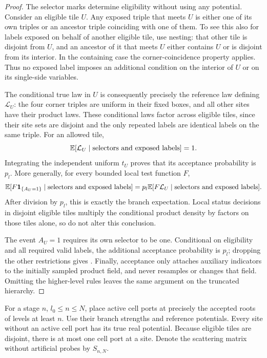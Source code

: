 \begin{proof}
The selector marks determine eligibility without using any potential.
Consider an eligible tile $U$.  Any exposed triple that meets $U$ is
either one of its own triples or an ancestor triple coinciding with one
of them.  To see this also for labels exposed on behalf of another
eligible tile, use nesting: that other tile is disjoint from $U$, and an
ancestor of it that meets $U$ either contains $U$ or is disjoint from its
interior.  In the containing case the corner-coincidence property applies.
Thus no exposed label imposes an additional condition on the interior of
$U$ or on its single-side variables.

The conditional true law in $U$ is consequently precisely the reference
law defining $\mathcal L_U$: the four corner triples are uniform in
their fixed boxes, and all other sites have their product laws.  These
conditional laws factor across eligible tiles, since their site sets
are disjoint and the only repeated labels are identical labels on the
same triple.  For an allowed tile,
\[
 \mathbb E[\mathcal L_U\mid\text{selectors and exposed labels}]=1.
\]
Integrating the independent uniform $t_U$ proves that its acceptance
probability is $p_l$.  More generally, for every bounded local test
function $F$,
\[
 \mathbb E[F\mathbf 1_{\{A_U=1\}}\mid\text{selectors and exposed labels}]
   =p_l\mathbb E[F\mathcal L_U\mid\text{selectors and exposed labels}].
\]
After division by $p_l$, this is exactly the branch expectation.
Local status decisions in disjoint eligible tiles multiply the
conditional product density by factors on those tiles alone, so do not
alter this conclusion.

The event $A_U=1$ requires its own selector to be one.  Conditional on
eligibility and all required valid labels, the additional acceptance
probability is $p_l$; dropping the other restrictions gives
.  Finally, acceptance only attaches auxiliary
indicators to the initially sampled product field, and never resamples
or changes that field.  Omitting the higher-level rules leaves the same
argument on the truncated hierarchy.
\end{proof}

For a stage $n$, $l_0\le n\le N$, place active cell ports at precisely
the accepted roots of levels at least $n$.  Use their branch strengths
and reference potentials.  Every site without an active cell port has
its true real potential.  Because eligible tiles are disjoint, there is
at most one cell port at a site.  Denote the scattering matrix without
artificial probes by $S_{n,N}$.

